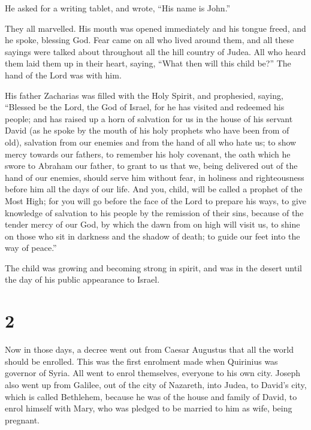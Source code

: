  He asked for a writing tablet, and wrote, ``His name is
John.''

They all marvelled.  His mouth was opened immediately and
his tongue freed, and he spoke, blessing God.  Fear came on
all who lived around them, and all these sayings were talked about
throughout all the hill country of Judea.  All who heard
them laid them up in their heart, saying, ``What then will this child
be?'' The hand of the Lord was with him.

 His father Zacharias was filled with the Holy Spirit, and
prophesied, saying,  ``Blessed be the Lord, the God of
Israel, for he has visited and redeemed his people;  and
has raised up a horn of salvation for us in the house of his servant
David  (as he spoke by the mouth of his holy prophets who
have been from of old),  salvation from our enemies and
from the hand of all who hate us;  to show mercy towards
our fathers, to remember his holy covenant,  the oath which
he swore to Abraham our father,  to grant to us that we,
being delivered out of the hand of our enemies, should serve him without
fear,  in holiness and righteousness before him all the
days of our life.  And you, child, will be called a prophet
of the Most High; for you will go before the face of the Lord to prepare
his ways,  to give knowledge of salvation to his people by
the remission of their sins,  because of the tender mercy
of our God, by which the dawn from on high will visit us, 
to shine on those who sit in darkness and the shadow of death; to guide
our feet into the way of peace.''

 The child was growing and becoming strong in spirit, and
was in the desert until the day of his public appearance to Israel.

\hypertarget{section-1}{%
\section{2}\label{section-1}}

 Now in those days, a decree went out from Caesar Augustus
that all the world should be enrolled.  This was the first
enrolment made when Quirinius was governor of Syria.  All
went to enrol themselves, everyone to his own city.  Joseph
also went up from Galilee, out of the city of Nazareth, into Judea, to
David's city, which is called Bethlehem, because he was of the house and
family of David,  to enrol himself with Mary, who was
pledged to be married to him as wife, being pregnant.

